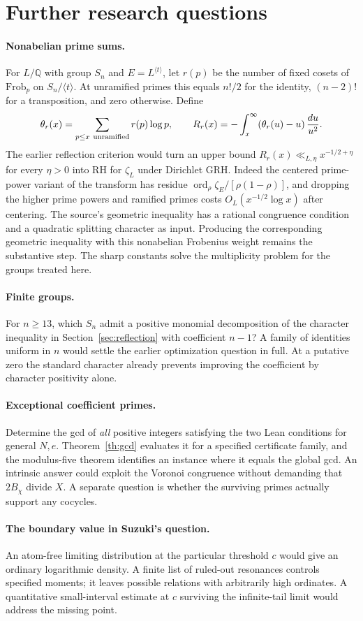 \documentclass[11pt,letterpaper]{article}
\begin{document}
\section{Further research questions}
\paragraph{Nonabelian prime sums.}
For $L/\mathbb Q$ with group $S_n$ and $E=L^{\langle t\rangle}$, let
$r(p)$ be the number of fixed cosets of $\mathrm{Frob}_p$ on $S_n/\langle t\rangle$.
At unramified primes this equals $n!/2$ for the identity, $(n-2)!$ for
a transposition, and zero otherwise. Define
\[
 \theta_r(x)=\sum_{p\le x\ {\rm unramified}} r(p)\log p,\qquad
 R_r(x)=-\int_x^\infty (\theta_r(u)-u)\,\frac{du}{u^2}.
\]
The earlier reflection criterion would turn an upper bound
$R_r(x)\ll_{L,\eta}x^{-1/2+\eta}$ for every $\eta>0$ into RH for
$\zeta_L$ under Dirichlet GRH. Indeed the centered prime-power variant
of the transform has residue
$\operatorname{ord}_\rho\zeta_E/[\rho(1-\rho)]$, and dropping the higher
prime powers and ramified primes costs $O_L(x^{-1/2}\log x)$ after
centering. The source's geometric inequality has a rational congruence
condition and a quadratic splitting character as input.
Producing the corresponding geometric inequality with this nonabelian
Frobenius weight remains the substantive step. The sharp constants solve
the multiplicity problem for the groups treated here.

\paragraph{Finite groups.}
For $n\ge13$, which $S_n$ admit a positive monomial decomposition of the character
inequality in Section~\ref{sec:reflection} with coefficient $n-1$?
A family of identities uniform in $n$ would settle the earlier
optimization question in full. At a putative zero the standard character
already prevents improving the coefficient by character positivity alone.

\paragraph{Exceptional coefficient primes.}
Determine the gcd of \emph{all} positive integers satisfying the two Lean
conditions for general $N,e$. Theorem~\ref{th:gcd} evaluates it for a
specified certificate family, and the modulus-five theorem identifies an
instance where it equals the global gcd. An intrinsic answer could exploit
the Voronoi congruence without demanding that $2B_\chi$ divide $X$.
A separate question is whether the surviving primes actually support any
cocycles.

\paragraph{The boundary value in Suzuki's question.}
An atom-free limiting distribution at the particular threshold $c$
would give an ordinary logarithmic density. A finite list of ruled-out
resonances controls specified moments; it leaves possible relations with
arbitrarily high ordinates. A quantitative small-interval estimate at $c$
surviving the infinite-tail limit would address the missing point.
\clearpage
\appendix

\end{document}
